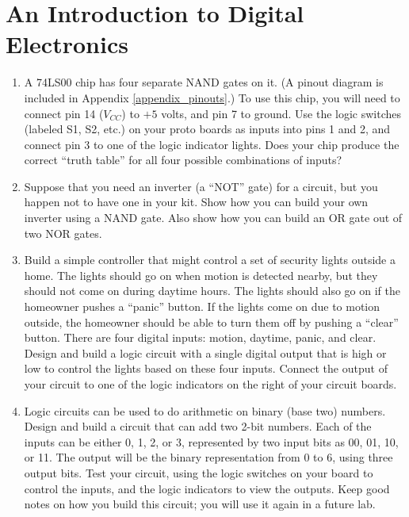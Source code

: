 \section{An Introduction to Digital Electronics}
\label{lab_digital_electronics}


\bigskip

\begin{enumerate}[wide]

\item A 74LS00 chip has four separate NAND gates on it.  (A pinout diagram is included in Appendix \ref{appendix_pinouts}.) To use this chip, you will need to connect pin 14 ($V_{CC}$) to $+5$ volts, and pin 7 to ground.  Use the logic switches (labeled S1, S2, etc.) on your proto boards as inputs into pins 1 and 2, and connect pin 3 to one of the logic indicator lights.  Does your chip produce the correct ``truth table'' for all four possible combinations of inputs?

\item Suppose that you need an inverter (a ``NOT'' gate) for a circuit, but you happen not to have one in your kit.  Show how you can build your own inverter using a NAND gate.  Also show how you can build an OR gate out of two NOR gates.

\item Build a simple controller that might control a set of security lights outside a home.  The lights should go on when motion is detected nearby, but they should not come on during daytime hours.  The lights should also go on if the homeowner pushes a ``panic'' button.  If the lights come on due to motion outside, the homeowner should be able to turn them off by pushing a ``clear'' button.  There are four digital inputs: motion, daytime, panic, and clear.  Design and build a logic circuit with a single digital output that is high or low to control the lights based on these four inputs.  Connect the output of your circuit to one of the logic indicators on the right of your circuit boards.

\item Logic circuits can be used to do arithmetic on binary (base two) numbers.  Design and build a circuit that can add two 2-bit numbers.  Each of the inputs can be either 0, 1, 2, or 3, represented by two input bits as 00, 01, 10, or 11.  The output will be the binary representation from 0 to 6, using three output bits.  Test your circuit, using the logic switches on your board to control the inputs, and the logic indicators to view the outputs.  Keep good notes on how you build this circuit; you will use it again in a future lab.


\end{enumerate}
